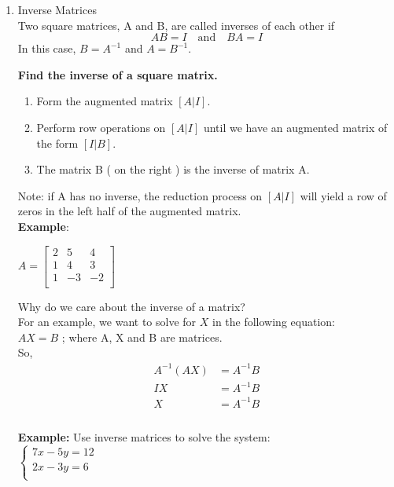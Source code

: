 \documentclass[12pt]{amsart}
\begin{document}
\begin{enumerate}
	\item Inverse Matrices \\
		Two square matrices, A and B, are called inverses of each other if 
		\[
		AB = I  \quad \text{and} \quad BA = I 
		\]
	In this case, $B = A^{-1}$ and $A = B^{-1}$. 
	
	 \textbf{Find the inverse of a square matrix. }
	 
	 \begin{enumerate}
	 \item Form the augmented matrix $[A|I]$.
	 \item Perform row operations on $[A|I]$ until we have an augmented matrix of the form $[I|B]$.
	 \item The matrix B ( on the right ) is the inverse of matrix A.
	 \end{enumerate}
	Note: if A has no inverse, the reduction process on $[A|I]$ will yield a row of zeros in the left half of the augmented matrix. \\
	\textbf{Example}:
	
	$A = \begin{bmatrix}
		2 & 5 & 4 \\
		1 & 4 & 3 \\
		1 & -3 & -2 \\
	\end{bmatrix}$
	
	\vspace{8in}
	
	Why do we care about the inverse of a matrix? \\
	For an example, we want to solve for $X$ in the following equation: \\
	$AX = B$ ; where A, X  and B are matrices. \\
	So,
\begin{equation} \label{eq1}
\begin{split}
A^{-1} (AX ) & = A^{-1}B \\
 IX & = A^{-1}B \\
 X & = A^{-1}B \\
\end{split}
\end{equation} \\

\textbf{Example:} Use inverse matrices to solve the system: \\

$\begin{cases}
	7x - 5y = 12 \\
	2x - 3y = 6 \\
\end{cases}$


\end{enumerate}
\end{document}
